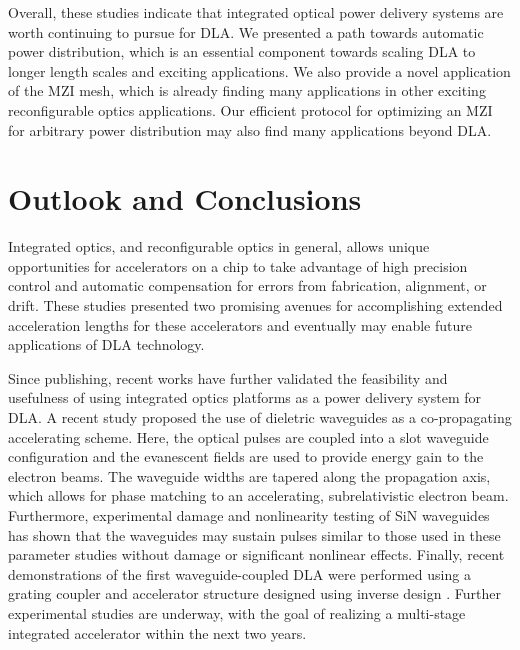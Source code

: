 Overall, these studies indicate that integrated optical power delivery systems are worth continuing to pursue for DLA.  We presented a path towards automatic power distribution, which is an essential component towards scaling DLA to longer length scales and exciting applications.  We also provide a novel application of the MZI mesh, which is already finding many applications in other exciting reconfigurable optics applications.  Our efficient protocol for optimizing an MZI for arbitrary power distribution may also find many applications beyond DLA.

\section{\label{sec:discussion}Outlook and Conclusions}


Integrated optics, and reconfigurable optics in general, allows unique opportunities for accelerators on a chip to take advantage of high precision control and automatic compensation for errors from fabrication, alignment, or drift. These studies presented two promising avenues for accomplishing extended acceleration lengths for these accelerators and eventually may enable future applications of DLA technology.

Since publishing, recent works have further validated the feasibility and usefulness of using integrated optics platforms as a power delivery system for DLA. A recent study \cite{zhao_design_2018} proposed the use of dieletric waveguides as a co-propagating accelerating scheme.  Here, the optical pulses are coupled into a slot waveguide configuration and the evanescent fields are used to provide energy gain to the electron beams.  The waveguide widths are tapered along the propagation axis, which allows for phase matching to an accelerating, subrelativistic electron beam.  
Furthermore, experimental damage and nonlinearity testing of SiN waveguides has shown that the waveguides may sustain pulses similar to those used in these parameter studies \cite{tan2019silicon} without damage or significant nonlinear effects.
Finally, recent demonstrations of the first waveguide-coupled DLA were performed using a grating coupler and accelerator structure designed using inverse design \cite{sapra2019inverse,sapra_-chip_2019}.
Further experimental studies are underway, with the goal of realizing a multi-stage integrated accelerator within the next two years.
